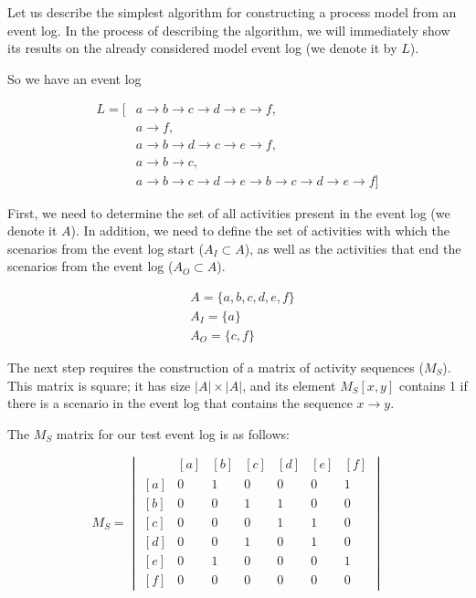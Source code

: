 \documentclass[
11pt,%
tightenlines,%
twoside,%
onecolumn,%
nofloats,%
nobibnotes,%
nofootinbib,%
superscriptaddress,%
noshowpacs,%
centertags]%
{revtex4}
\begin{document}
Let us describe the simplest algorithm for constructing a process model from an event log.
In the process of describing the algorithm, we will immediately show its results on the already considered model event log (we denote it by $L$).

So we have an event log

\begin{equation}
\begin{aligned}
L = [
&{a \rightarrow b \rightarrow c \rightarrow d \rightarrow e \rightarrow f},\\
&{a \rightarrow f},\\
&{a \rightarrow b \rightarrow d \rightarrow c \rightarrow e \rightarrow f},\\
&{a \rightarrow b \rightarrow c},\\
&{a \rightarrow b \rightarrow c \rightarrow d \rightarrow e \rightarrow b \rightarrow c \rightarrow d \rightarrow e \rightarrow f}
]
\end{aligned}
\end{equation}

First, we need to determine the set of all activities present in the event log (we denote it $A$).
In addition, we need to define the set of activities with which the scenarios from the event log start ($A_I \subset A$), as well as the activities that end the scenarios from the event log ($A_O \subset A$).

\begin{equation}
\begin{aligned}
&A = \{a, b, c, d, e, f\} \\
&A_I = \{a\} \\
&A_O = \{c, f\}
\end{aligned}
\end{equation}

The next step requires the construction of a matrix of activity sequences ($M_S$).
This matrix is square; it has size $| A | \times | A |$, and its element $M_S[x, y]$ contains 1 if there is a scenario in the event log that contains the sequence $x \rightarrow y$.

The $M_S$ matrix for our test event log is as follows:

\begin{equation}
M_S = \begin{vmatrix}
\ & [a] & [b] & [c] & [d] & [e] & [f] \\
[a] & 0 & 1 & 0 & 0 & 0 & 1 \\ 
[b] & 0 & 0 & 1 & 1 & 0 & 0 \\
[c] & 0 & 0 & 0 & 1 & 1 & 0 \\
[d] & 0 & 0 & 1 & 0 & 1 & 0 \\
[e] & 0 & 1 & 0 & 0 & 0 & 1 \\
[f] & 0 & 0 & 0 & 0 & 0 & 0
\end{vmatrix}
\end{equation}
\end{document}
